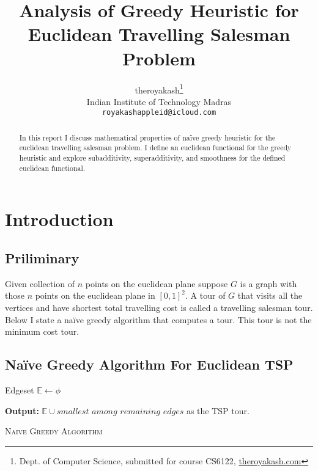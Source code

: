 \documentclass{article}
\title{Analysis of Greedy Heuristic for Euclidean Travelling Salesman Problem}
\author{
    theroyakash\thanks{Dept. of Computer Science, submitted for course \sf CS6122, \href{https://theroyakash.com}{theroyakash.com}}\\
    Indian Institute of Technology Madras \\
    \texttt{royakashappleid@icloud.com} \\
}
\begin{document}
\maketitle

\begin{abstract}
    In this report I discuss mathematical properties of
    naïve greedy heuristic for the euclidean travelling salesman problem.
    I define an euclidean functional for the greedy heuristic and explore
    subadditivity, superadditivity, and smoothness for the defined
    euclidean functional.
\end{abstract}

\section{Introduction}
\subsection{Priliminary}
Given collection of $n$ points on the euclidean plane suppose $G$ is a graph
with those $n$ points on the euclidean plane in $[0,1]^2$. A tour of $G$ that
visits all the vertices and have shortest total travelling cost is called a
travelling salesman tour. Below I state a naïve greedy algorithm that computes
a tour. This tour is not the minimum cost tour.

\subsection{Naïve Greedy Algorithm For Euclidean TSP}

\begin{algorithm}[H]
    \label{alg:1}

    \BlankLine
    Edgeset $\mathbb{E} \gets \phi$\\

    \textbf{Output:} $\mathbb{E} \cup \textit{smallest among remaining edges}$ as the TSP tour.

    \caption{\textsc{Naive Greedy Algorithm}}
\end{algorithm}
\end{document}
